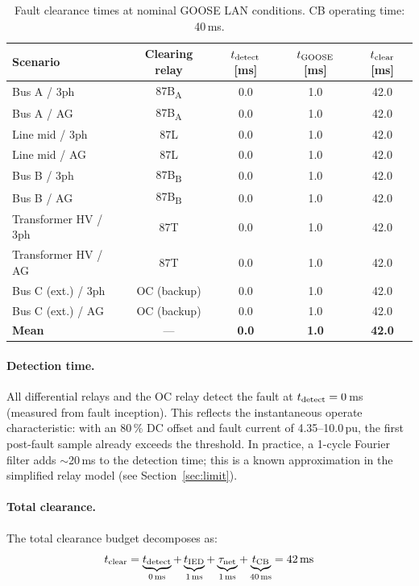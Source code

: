 \documentclass[12pt,a4paper]{article}
\begin{document}
\begin{table}[H]
  \centering
  \caption{Fault clearance times at nominal GOOSE LAN conditions.
           CB operating time: 40\,ms.}
  \label{tab:clearance_nom}
  \begin{tabular}{lcccc}
    \toprule
    Scenario & Clearing relay & $t_{\rm detect}$ [ms]
             & $t_{\rm GOOSE}$ [ms] & $t_{\rm clear}$ [ms] \\
    \midrule
    Bus A / 3ph          & 87B\textsubscript{A} & 0.0 & 1.0 & 42.0 \\
    Bus A / AG           & 87B\textsubscript{A} & 0.0 & 1.0 & 42.0 \\
    Line mid / 3ph       & 87L                  & 0.0 & 1.0 & 42.0 \\
    Line mid / AG        & 87L                  & 0.0 & 1.0 & 42.0 \\
    Bus B / 3ph          & 87B\textsubscript{B} & 0.0 & 1.0 & 42.0 \\
    Bus B / AG           & 87B\textsubscript{B} & 0.0 & 1.0 & 42.0 \\
    Transformer HV / 3ph & 87T                  & 0.0 & 1.0 & 42.0 \\
    Transformer HV / AG  & 87T                  & 0.0 & 1.0 & 42.0 \\
    Bus C (ext.) / 3ph   & OC (backup)          & 0.0 & 1.0 & 42.0 \\
    Bus C (ext.) / AG    & OC (backup)          & 0.0 & 1.0 & 42.0 \\
    \midrule
    \textbf{Mean} & --- & \textbf{0.0} & \textbf{1.0} & \textbf{42.0} \\
    \bottomrule
  \end{tabular}
\end{table}

\paragraph{Detection time.}
All differential relays and the OC relay detect the fault at
$t_{\rm detect} = 0$\,ms (measured from fault inception).  This
reflects the instantaneous operate characteristic: with an 80\,\%
DC offset and fault current of 4.35--10.0\,pu, the first post-fault
sample already exceeds the threshold.  In practice, a 1-cycle Fourier
filter adds $\sim$20\,ms to the detection time; this is a known
approximation in the simplified relay model (see Section~\ref{sec:limit}).

\paragraph{Total clearance.}
The total clearance budget decomposes as:
\begin{equation}
  t_{\rm clear} = \underbrace{t_{\rm detect}}_{0\,\text{ms}}
    + \underbrace{t_{\rm IED}}_{1\,\text{ms}}
    + \underbrace{\tau_{\rm net}}_{1\,\text{ms}}
    + \underbrace{t_{\rm CB}}_{40\,\text{ms}}
    = 42\,\text{ms}
  \label{eq:clearance}
\end{equation}
\end{document}
